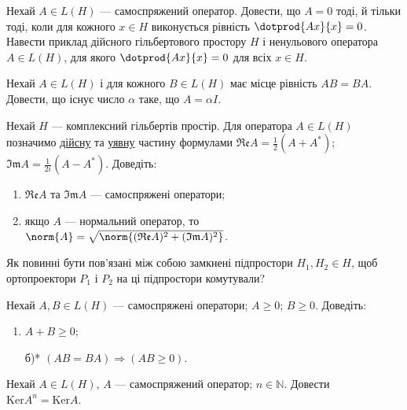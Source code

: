 
\begin{exercise}
    Нехай $A \in L(H)$ --- самоспряжений оператор. Довести, що $A = 0$ тоді,
    й тільки тоді, коли для кожного $x \in H$ виконується рівність $\dotprod{Ax}{x}=0$.
    Навести приклад дійсного гільбертового простору $H$ і ненульового оператора
    $A \in L(H)$, для якого $\dotprod{Ax}{x}=0$ для всіх $x \in H$.
\end{exercise}

\begin{exercise}
    Нехай $A \in L(H)$ і для кожного $B \in L(H)$ має місце рівність $AB = BA$.
    Довести, що існує число $\alpha$ таке, що $A = \alpha I$.
\end{exercise}

\begin{exercise}
    Нехай $H$ --- комплексний гільбертів простір. Для оператора $A \in L(H)$ позначимо
    \uline{дійсну} та \uline{уявну} частину формулами $\mathfrak{Re}A = \frac{1}{2} (A + A^*)$;
    $\mathfrak{Im}A = \frac{1}{2i} (A - A^*)$. Доведіть:
    \begin{enumerate}[label=\ukr*)]
        \item $\mathfrak{Re}A$ та $\mathfrak{Im}A$ --- самоспряжені оператори;
        \item якщо $A$ --- нормальний оператор, то $\norm{A} = 
        \sqrt{\norm{ (\mathfrak{Re}A)^2 + (\mathfrak{Im}A)^2 }}$.
    \end{enumerate}
\end{exercise}

\begin{exercise}
    Як повинні бути пов'язані між собою замкнені підпростори $H_1, H_2 \in H$,
    щоб ортопроектори $P_1$ і $P_2$ на ці підпростори комутували?
\end{exercise}

\begin{exercise}
    Нехай $A, B \in L(H)$ --- самоспряжені оператори; $A \geq 0$; $B \geq 0$.
    Доведіть:
    \begin{enumerate}
        \item $A + B \geq 0$;
        \item[б)*] $(AB = BA) \Rightarrow (AB \geq 0)$. %
    \end{enumerate}
\end{exercise}

\begin{exercise}
    Нехай $A \in L(H)$, $A$ --- самоспряжений оператор; $n \in \mathbb{N}$.
    Довести $\mathrm{Ker}A^n = \mathrm{Ker}A$. 
\end{exercise}


